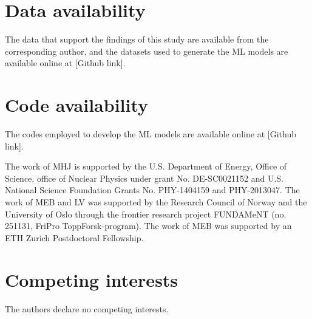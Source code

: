 \documentclass[superscriptaddress,unsortedaddress,
 amsmath,amssymb,
 aps,
]{revtex4-2}
\begin{document}
\section*{Data availability} 

The data that support the findings of this study are available from the corresponding author, and the datasets used to generate the ML models are available online at [Github link]. 

\section*{Code availability} 
The codes employed to develop the ML models are available online at [Github link]. 


\begin{acknowledgments}

The work of MHJ is supported by the U.S. Department of Energy,
Office of Science, office of Nuclear Physics under grant
No. DE-SC0021152 and U.S. National Science Foundation Grants
No. PHY-1404159 and PHY-2013047. 
The work of MEB and LV was supported by the Research Council of Norway and the University of Oslo through the frontier research project FUNDAMeNT (no. 251131, FriPro ToppForsk-program). 
The work of MEB was supported by an ETH Zurich Postdoctoral Fellowship. 

\end{acknowledgments}


\section*{Competing interests}
The authors declare no competing interests.
\end{document}
